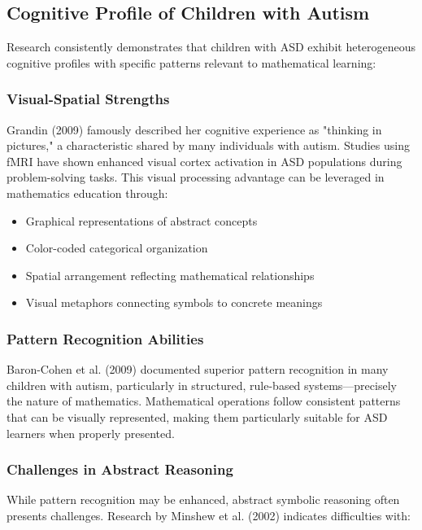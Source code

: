 \documentclass[12pt, a4paper]{article}
\begin{document}
\subsection{Cognitive Profile of Children with Autism}

Research consistently demonstrates that children with ASD exhibit heterogeneous cognitive profiles with specific patterns relevant to mathematical learning:

\subsubsection{Visual-Spatial Strengths}

Grandin (2009) famously described her cognitive experience as "thinking in pictures," a characteristic shared by many individuals with autism. Studies using fMRI have shown enhanced visual cortex activation in ASD populations during problem-solving tasks. This visual processing advantage can be leveraged in mathematics education through:

\begin{itemize}[leftmargin=*]
    \item Graphical representations of abstract concepts
    \item Color-coded categorical organization
    \item Spatial arrangement reflecting mathematical relationships
    \item Visual metaphors connecting symbols to concrete meanings
\end{itemize}

\subsubsection{Pattern Recognition Abilities}

Baron-Cohen et al. (2009) documented superior pattern recognition in many children with autism, particularly in structured, rule-based systems—precisely the nature of mathematics. Mathematical operations follow consistent patterns that can be visually represented, making them particularly suitable for ASD learners when properly presented.

\subsubsection{Challenges in Abstract Reasoning}

While pattern recognition may be enhanced, abstract symbolic reasoning often presents challenges. Research by Minshew et al. (2002) indicates difficulties with:
\end{document}
